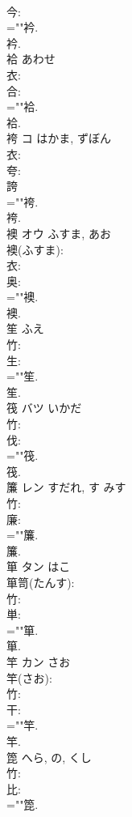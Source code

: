 \documentclass[8pt]{extreport}
\begin{document}
\begin{CJK}{UTF8}{min}
\\	今: 
\\	=""衿.
\\	衿.
\\	袷		あわせ				
\\	衣: 
\\	合: 
\\	=""袷.
\\	袷.
\\	袴	コ	はかま, ずぼん		
\\	衣: 
\\	夸: 
\\	誇 
\\	=""袴.
\\	袴.
\\	襖	オウ	ふすま, あお		
\\	襖(ふすま): 
\\	衣: 
\\	奥: 
\\	=""襖.
\\	襖.
\\	笙		ふえ				
\\	竹: 
\\	生: 
\\	=""笙.
\\	笙.
\\	筏	バツ	いかだ		
\\	竹: 
\\	伐: 
\\	=""筏.
\\	筏.
\\	簾	レン	すだれ, す	みす	
\\	竹: 
\\	廉: 
\\	=""簾.
\\	簾.
\\	箪	タン	はこ		
\\	箪笥(たんす): 
\\	竹: 
\\	単: 
\\	=""箪.
\\	箪.
\\	竿	カン	さお		
\\	竿(さお): 
\\	竹: 
\\	干: 
\\	=""竿.
\\	竿.
\\	箆		へら, の, くし				
\\	竹: 
\\	比: 
\\	=""箆.

\end{CJK}
\end{document}

